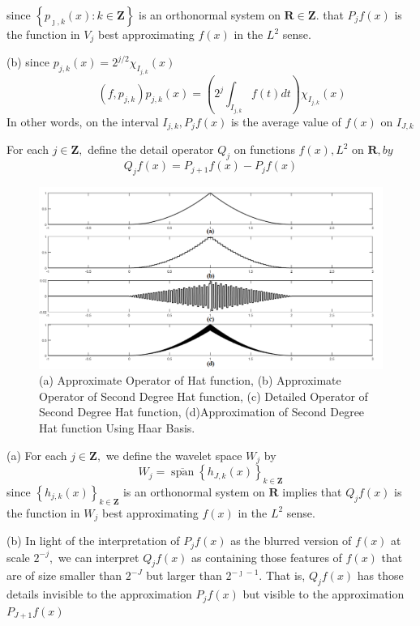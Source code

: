 since $\left\{p_{\jmath, k}(x): k \in \mathbf{Z}\right\}$ is an orthonormal system on $\mathbf{R} \in \mathbf{Z}$.
that $P_{j} f(x)$ is the function in $V_{j}$ best approximating $f(x)$ in the $L^{2}$ sense.

(b) since $p_{j, k}(x)=2^{j / 2} \chi_{I_{j, k}}(x)$
$$
\qquad\left(f, p_{j, k}\right) p_{j, k}(x)=\left(2^{j} \int_{I_{j, k}} f(t) d t\right) \chi_{I_{j, k}}(x) 
$$
In other words, on the interval $ I_{j, k}, P_{j} f(x)$ is the average value of $f(x)$ on ${I_{J, k}}$


\begin{definition}
For each $j \in \mathbf{Z},$ define the detail operator $Q_{j}$ on functions
$f(x), L^{2}$ on $\mathbf{R}, b y$
$$
Q_{j} f(x)=P_{j+1} f(x)-P_{j} f(x)
$$
\end{definition} 
\begin{figure}[h]
    \centering
    \includegraphics[width=\textwidth]{sections/PxQxFx.png}
    \caption{(a) Approximate Operator of Hat function, (b) Approximate Operator of Second Degree Hat function, (c) Detailed Operator of Second Degree Hat function, (d)Approximation of Second Degree Hat function Using Haar Basis.}
    \label{fig:PxQxFx}
\end{figure}


(a) For each $j \in \mathbf{Z},$ we define the wavelet space $W_{j}$ by
$$
W_{j}=\overline{\operatorname{span}}\left\{h_{J, k}(x)\right\}_{k \in \mathbf{Z}}
$$
since $\left\{h_{j, k}(x)\right\}_{k \in \mathbf{Z}}$ is an orthonormal system on $\mathbf{R}$ implies that $Q_{j} f(x)$ is the function in $W_{j}$ best approximating $f(x)$ in the $L^{2}$ sense.

(b) In light of the interpretation of $P_{j} f(x)$ as the blurred version of $f(x)$ at scale $2^{-j},$ we can interpret $Q_{j} f(x)$ as containing those features of $f(x)$ that are of size smaller than $2^{-J}$ but larger than $2^{-\jmath-1} .$ That is, $Q_{j} f(x)$ has those details invisible to the approximation $P_{j} f(x)$ but visible to the approximation $P_{J+1} f(x)$

